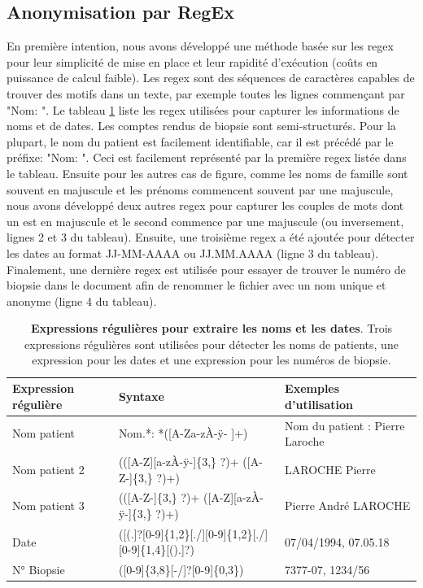 \subsection{Anonymisation par RegEx}
En première intention, nous avons développé une méthode basée sur les \gls{regex} pour leur simplicité de mise en place et leur rapidité d'exécution (coûts en puissance de calcul faible). Les \gls{regex} sont des séquences de caractères capables de trouver des motifs dans un texte, par exemple toutes les lignes commençant par "Nom: ". Le tableau \ref{tab:regex} liste les \gls{regex} utilisées pour capturer les informations de noms et de dates. Les comptes rendus de biopsie sont semi-structurés. Pour la plupart, le nom du patient est facilement identifiable, car il est précédé par le préfixe: "Nom: ". Ceci est facilement représenté par la première \gls{regex} listée dans le tableau. Ensuite pour les autres cas de figure, comme les noms de famille sont souvent en majuscule et les prénoms commencent souvent par une majuscule, nous avons développé deux autres \gls{regex} pour capturer les couples de mots dont un est en majuscule et le second commence par une majuscule (ou inversement, lignes 2 et 3 du tableau). 
Ensuite, une troisième \gls{regex} a été ajoutée pour détecter les dates au format JJ-MM-AAAA ou JJ.MM.AAAA (ligne 3 du tableau). Finalement, une dernière \gls{regex} est utilisée pour essayer de trouver le numéro de biopsie dans le document afin de renommer le fichier avec un nom unique et anonyme (ligne 4 du tableau). 
\begin{table}[!ht]
\centering
\caption[Expressions régulières pour extraire les noms et les dates]{\textbf{Expressions régulières pour extraire les noms et les dates}. Trois expressions régulières sont utilisées pour détecter les noms de patients, une expression pour les dates et une expression pour les numéros de biopsie.}
\label{tab:regex}
\begin{tabular}{|l|l|l|}
\hline
\textbf{Expression régulière} & \textbf{Syntaxe} & \textbf{Exemples d'utilisation} \\ \hline
Nom patient & Nom.*: *([A-Za-zÀ-ÿ- ]+) & Nom du patient : Pierre Laroche \\ \hline
Nom patient 2& (([A-Z][a-zÀ-ÿ-]\{3,\} ?)+ ([A-Z-]\{3,\} ?)+) & LAROCHE Pierre \\ \hline
Nom patient 3 & (([A-Z-]\{3,\} ?)+ ([A-Z][a-zÀ-ÿ-]\{3,\} ?)+) & Pierre André LAROCHE \\ \hline
Date & ([(.]?[0-9]\{1,2\}[./][0-9]\{1,2\}[./][0-9]\{1,4\}[().]?) & 07/04/1994, 07.05.18 \\ \hline
N° Biopsie & ([0-9]\{3,8\}[-/]?[0-9]\{0,3\}) & 7377-07, 1234/56 \\ \hline
\end{tabular}
\end{table}
